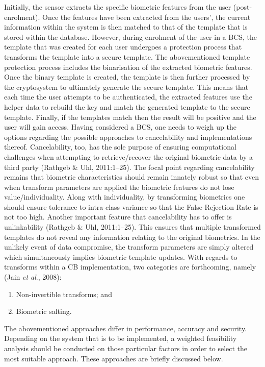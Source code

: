 Initially, the sensor extracts the specific biometric features from the user (post-enrolment). Once the features have been extracted from the users’, the current information within the system is then matched to that of the template that is stored within the database. However, during enrolment of the user in a BCS, the template that was created for each user undergoes a protection process that transforms the template into a secure template. The abovementioned template protection process includes the binarisation of the extracted biometric features. Once the binary template is created, the template is then further processed by the cryptosystem to ultimately generate the secure template. This means that each time the user attempts to be authenticated, the extracted features use the helper data to rebuild the key and match the generated template to the secure template. Finally, if the templates match then the result will be positive and the user will gain access. 
Having considered a BCS, one needs to weigh up the options regarding the possible approaches to cancelability and implementations thereof. Cancelability, too, has the sole purpose of ensuring computational challenges when attempting to retrieve/recover the original biometric data by a third party (Rathgeb \& Uhl, 2011:1–25). The focal point regarding cancelability remains that biometric characteristics should remain innately robust so that even when transform parameters are applied the biometric features do not lose value/individuality. Along with individuality, by transforming biometrics one should ensure tolerance to intra-class variance so that the False Rejection Rate is not too high. Another important feature that cancelability has to offer is unlinkability (Rathgeb \& Uhl, 2011:1–25). This ensures that multiple transformed templates do not reveal any information relating to the original biometrics. In the unlikely event of data compromise, the transform parameters are simply altered which simultaneously implies biometric template updates. 
With regards to transforms within a CB implementation, two categories are forthcoming, namely (Jain \textit{et al}., 2008):
  

\begin{enumerate}[label=\roman*.]
	\item Non-invertible transforms; and
	\item Biometric salting.
\end{enumerate}

The abovementioned approaches differ in performance, accuracy and security. Depending on the system that is to be implemented, a weighted feasibility analysis should be conducted on those particular factors in order to select the most suitable approach. These approaches are briefly discussed below.


